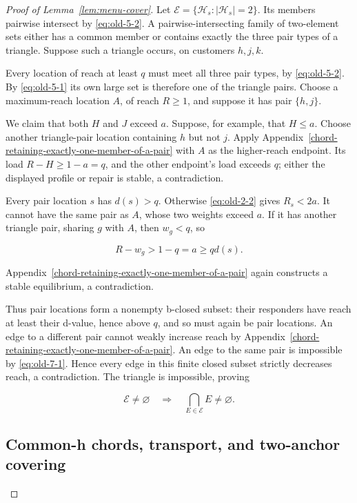 \documentclass[11pt]{amsart}
\numberwithin{equation}{section}
\theoremstyle{definition}
\begin{document}
\begin{proof}[Proof of Lemma~\ref{lem:menu-cover}]
Let \(\mathcal E=\{\mathcal H_s:|\mathcal H_s|=2\}\). Its members pairwise intersect by \eqref{eq:old-5-2}. A pairwise-intersecting family of two-element sets either has a common member or contains exactly the three pair types of a triangle. Suppose such a triangle occurs, on customers \(h,j,k\).

Every location of reach at least \(q\) must meet all three pair types, by \eqref{eq:old-5-2}. By \eqref{eq:old-5-1} its own large set is therefore one of the triangle pairs. Choose a maximum-reach location \(A\), of reach \(R\ge1\), and suppose it has pair \(\{h,j\}\).

We claim that both \(H\) and \(J\) exceed \(a\). Suppose, for example, that \(H\le a\). Choose another triangle-pair location containing \(h\) but not \(j\). Apply Appendix~\ref{chord-retaining-exactly-one-member-of-a-pair} with \(A\) as the higher-reach endpoint. Its load \(R-H\ge1-a=q\), and the other endpoint's load exceeds \(q\); either the displayed profile or repair is stable, a contradiction.

Every pair location \(s\) has \(d(s)>q\). Otherwise \eqref{eq:old-2-2} gives \(R_s<2a\). It cannot have the same pair as \(A\), whose two weights exceed \(a\). If it has another triangle pair, sharing \(g\) with \(A\), then \(w_g<q\), so

\[
R-w_g>1-q=a\ge qd(s).
\]

Appendix~\ref{chord-retaining-exactly-one-member-of-a-pair} again constructs a stable equilibrium, a contradiction.

Thus pair locations form a nonempty b-closed subset: their responders have reach at least their d-value, hence above \(q\), and so must again be pair locations. An edge to a different pair cannot weakly increase reach by Appendix~\ref{chord-retaining-exactly-one-member-of-a-pair}. An edge to the same pair is impossible by \eqref{eq:old-7-1}. Hence every edge in this finite closed subset strictly decreases reach, a contradiction. The triangle is impossible, proving

\begin{equation}
\mathcal E\ne\varnothing\quad\Longrightarrow\quad\bigcap_{E\in\mathcal E}E\ne\varnothing. \label{eq:old-8-1}
\end{equation}


\subsection{Common-h chords, transport, and two-anchor covering}\label{common-h-chords-transport-and-two-anchor-covering}


\end{proof}
\end{document}
